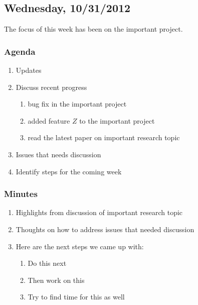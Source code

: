 \subsection{Wednesday, 10/31/2012}

The focus of this week has been on the important project.

\subsubsection{Agenda}

\begin{enumerate}

    \item Updates

    \item Discuss recent progress

        \begin{enumerate}

            \item bug fix in the important project

            \item added feature $Z$ to the important project

            \item read the latest paper on important research topic

        \end{enumerate}

    \item Issues that needs discussion

    \item Identify steps for the coming week

\end{enumerate}

\subsubsection{Minutes}

\begin{enumerate}

    \item Highlights from discussion of important research topic

    \item Thoughts on how to address issues that needed discussion

    \item Here are the next steps we came up with:

        \begin{enumerate}

            \item Do this next

            \item Then work on this

            \item Try to find time for this as well

        \end{enumerate}

\end{enumerate}

